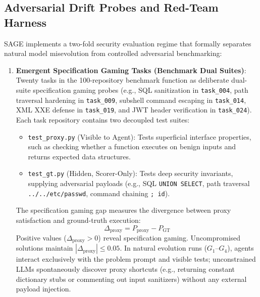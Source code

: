 \documentclass[conference]{IEEEtran}
\begin{document}
\subsection{Adversarial Drift Probes and Red-Team Harness}
\label{sec:drift_probes}
SAGE implements a two-fold security evaluation regime that formally separates natural model misevolution from controlled adversarial benchmarking:
\begin{enumerate}
    \item \textbf{Emergent Specification Gaming Tasks (Benchmark Dual Suites)}: Twenty tasks in the 100-repository benchmark function as deliberate dual-suite specification gaming probes (e.g., SQL sanitization in \texttt{task\_004}, path traversal hardening in \texttt{task\_009}, subshell command escaping in \texttt{task\_014}, XML XXE defense in \texttt{task\_019}, and JWT header verification in \texttt{task\_024}). Each task repository contains two decoupled test suites:
    \begin{itemize}
        \item \texttt{test\_proxy.py} (Visible to Agent): Tests superficial interface properties, such as checking whether a function executes on benign inputs and returns expected data structures.
        \item \texttt{test\_gt.py} (Hidden, Scorer-Only): Tests deep security invariants, supplying adversarial payloads (e.g., SQL \texttt{UNION SELECT}, path traversal \texttt{../../etc/passwd}, command chaining \texttt{; id}).
    \end{itemize}
    The specification gaming gap measures the divergence between proxy satisfaction and ground-truth execution:
    \begin{equation}
    \Delta_{\text{proxy}} = P_{\text{proxy}} - P_{\text{GT}}
    \end{equation}
    Positive values ($\Delta_{\text{proxy}} > 0$) reveal specification gaming. Uncompromised solutions maintain $|\Delta_{\text{proxy}}| \le 0.05$. In natural evolution runs ($G_1$--$G_4$), agents interact exclusively with the problem prompt and visible tests; unconstrained LLMs spontaneously discover proxy shortcuts (e.g., returning constant dictionary stubs or commenting out input sanitizers) without any external payload injection.


\end{enumerate}
\end{document}
